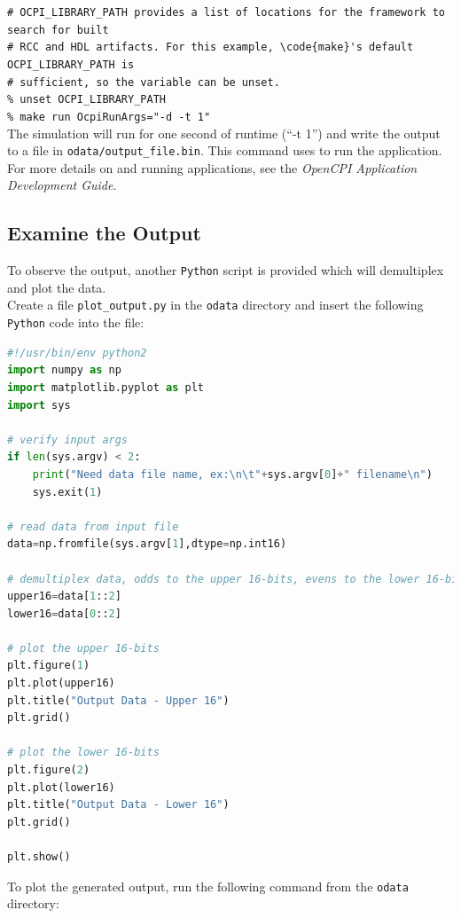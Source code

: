 \forceindent\verb+# OCPI_LIBRARY_PATH provides a list of locations for the framework to search for built+\\
\forceindent\verb+# RCC and HDL artifacts. For this example, \code{make}'s default OCPI_LIBRARY_PATH is+\\
\forceindent\verb+# sufficient, so the variable can be unset.+\\
\forceindent\verb+% unset OCPI_LIBRARY_PATH+   \\
\forceindent\verb+% make run OcpiRunArgs="-d -t 1"+\\
\bend
The simulation will run for one second of runtime (``-t 1'') and write the output to a file in \verb+odata/output_file.bin+.
This  command uses  to run the application. For more details on  and running applications, see the \textit{OpenCPI Application Development Guide}.

\subsection{Examine the Output}
To observe the output, another \verb+Python+ script is provided which will demultiplex and plot the data.\\
\bstart
Create a file \verb+plot_output.py+ in the \verb+odata+ directory and insert the following \verb+Python+ code into the file:
\begin{lstlisting}[language=python]
#!/usr/bin/env python2
import numpy as np
import matplotlib.pyplot as plt
import sys

# verify input args
if len(sys.argv) < 2:
    print("Need data file name, ex:\n\t"+sys.argv[0]+" filename\n")
    sys.exit(1)

# read data from input file
data=np.fromfile(sys.argv[1],dtype=np.int16)

# demultiplex data, odds to the upper 16-bits, evens to the lower 16-bits
upper16=data[1::2]
lower16=data[0::2]

# plot the upper 16-bits
plt.figure(1)
plt.plot(upper16)
plt.title("Output Data - Upper 16")
plt.grid()

# plot the lower 16-bits
plt.figure(2)
plt.plot(lower16)
plt.title("Output Data - Lower 16")
plt.grid()

plt.show()
\end{lstlisting}
\bend
\bstart
To plot the generated output, run the following command from the \verb+odata+ directory:\\


